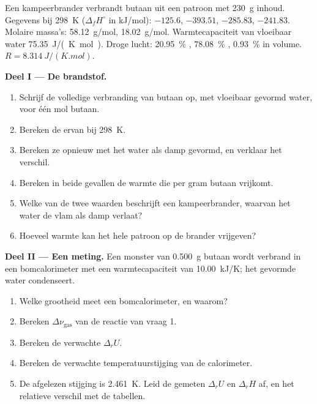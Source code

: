 \begin{problem}
\label{pb:b2:reaction-enthalpy:1}
Een kampeerbrander verbrandt butaan uit een patroon met \qty{230}{g} inhoud.
Gegevens bij \qty{298}{K} ($\Delta_f H^\circ$ in \unit{kJ/mol}): 
$-125.6$,  $-393.51$,  $-285.83$, 
$-241.83$. Molaire massa's:  \qty{58.12}{g/mol}, 
\qty{18.02}{g/mol}. Warmtecapaciteit van vloeibaar water
\qty{75.35}{J/(K.mol)}. Droge lucht: \qty{20.95}{\percent} ,
\qty{78.08}{\percent} , \qty{0.93}{\percent}  in volume. $R = \qty{8.314}{J/(K.mol)}$.

\medskip
\noindent\textbf{Deel I --- De brandstof.}
\begin{enumerate}
  \item Schrijf de volledige verbranding van butaan op, met vloeibaar gevormd water,
        voor één mol butaan.
  \item Bereken de  ervan bij \qty{298}{K}.
  \item Bereken ze opnieuw met het water als damp gevormd, en verklaar het
        verschil.
  \item Bereken in beide gevallen de warmte die per gram butaan vrijkomt.
  \item Welke van de twee waarden beschrijft een kampeerbrander, waarvan het water
        de vlam als damp verlaat?
  \item Hoeveel warmte kan het hele patroon op de brander vrijgeven?
\end{enumerate}

\medskip
\noindent\textbf{Deel II --- Een meting.}
Een monster van \qty{0.500}{g} butaan wordt verbrand in een bomcalorimeter met een
warmtecapaciteit van \qty{10.00}{kJ/K}; het gevormde water condenseert.
\begin{enumerate}[resume]
  \item Welke grootheid meet een bomcalorimeter, en waarom?
  \item Bereken $\Delta\nu_{\text{gas}}$ van de reactie van vraag 1.
  \item Bereken de verwachte $\Delta_r U$.
  \item Bereken de verwachte temperatuurstijging van de calorimeter.
  \item De afgelezen stijging is \qty{2.461}{K}. Leid de gemeten $\Delta_r U$
        en $\Delta_r H$ af, en het relatieve verschil met de tabellen.
\end{enumerate}


\end{problem}

